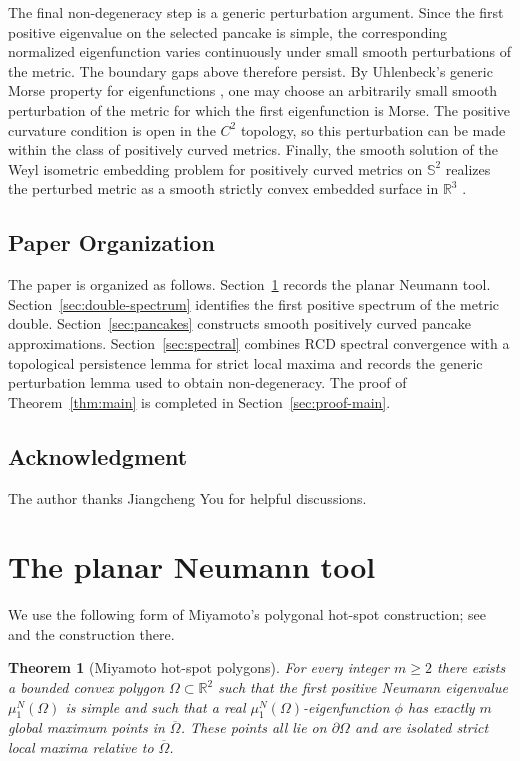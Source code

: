 \documentclass[11pt]{amsart}
\newtheorem{theorem}{Theorem}[section]
\numberwithin{equation}{section}
\newcommand{\R}{\mathbb R}
\newcommand{\Om}{\Omega}
\newcommand{\RCD}{\mathrm{RCD}}
\begin{document}
The final non-degeneracy step is a generic perturbation argument.  Since the
first positive eigenvalue on the selected pancake is simple, the corresponding
normalized eigenfunction varies continuously under small smooth perturbations of
the metric.  The boundary gaps above therefore persist.  By Uhlenbeck's generic
Morse property for eigenfunctions \cite{Uhlenbeck1976}, one may choose an
arbitrarily small smooth perturbation of the metric for which the first
eigenfunction is Morse.  The positive curvature condition is open in the
$C^2$ topology, so this perturbation can be made within the class of positively
curved metrics.  Finally, the smooth solution of the Weyl isometric embedding
problem for positively curved metrics on $\mathbb S^2$ realizes the perturbed
metric as a smooth strictly convex embedded surface in $\R^3$
\cite{Nirenberg1953,Pogorelov1952}.

\subsection{Paper Organization}

The paper is organized as follows.  Section~\ref{sec:neumann-input} records the
planar Neumann tool.  Section~\ref{sec:double-spectrum} identifies the first
positive spectrum of the metric double.  Section~\ref{sec:pancakes} constructs
smooth positively curved pancake approximations.  Section~\ref{sec:spectral}
combines $\RCD$ spectral convergence with a topological persistence lemma for
strict local maxima and records the generic perturbation lemma used to obtain
non-degeneracy.  The proof of Theorem~\ref{thm:main} is completed in
Section~\ref{sec:proof-main}.

\subsection*{Acknowledgment}
The author thanks Jiangcheng You for helpful discussions.

\section{The planar Neumann tool}\label{sec:neumann-input}

   We use the following form of Miyamoto's polygonal hot-spot construction; see
\cite[Theorem A]{MiyamotoJJIAM} and the construction there.

\begin{theorem}[Miyamoto hot-spot polygons]\label{thm:miyamoto}
For every integer $m\ge 2$ there exists a bounded convex polygon
$\Om\subset\R^2$ such that the first positive Neumann eigenvalue $\mu_1^N(\Om)$
is simple and such that a real $\mu_1^N(\Om)$-eigenfunction $\phi$ has exactly
$m$ global maximum points in $\overline\Om$.  These points all lie on
$\partial\Om$ and are isolated strict local maxima relative to $\overline\Om$.
\end{theorem}
\end{document}
